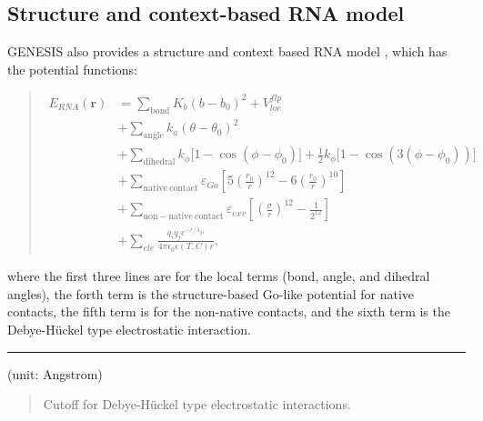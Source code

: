 \documentclass[a4paper,11pt,oneside,english]{sphinxmanual}
\begin{document}
\subsection{Structure and context-based RNA model}
\label{\detokenize{05_Energy:structure-and-context-based-rna-model}}
GENESIS also provides a structure and context based RNA model , which has the potential functions:
\begin{quote}

\vspace{-5mm}
\begin{equation*}
\begin{split}E_{RNA}(\mathbf{r}) & = \sum_{\mathrm{bond}} K_b\left(b - b_{0}\right)^2 + V_{loc}^{flp} \\
     & + \sum_{\mathrm{angle}} k_a \left(\theta - \theta_0\right)^2 \\
     & + \sum_{\mathrm{dihedral}} k_{\phi} \big[ 1-\cos(\phi - \phi_0) \big] + \frac{1}{2}k_{\phi} \big[ 1-\cos\left(3(\phi - \phi_0)\right) \big] \\
     & + \sum_{\mathrm{native\ contact}} \varepsilon_{Go} \left[ 5\left(\frac{r_0}{r}\right)^{12} - 6 \left(\frac{r_0}{r}\right)^{10} \right] \\
     & + \sum_{\mathrm{non-native\ contact}} \varepsilon_{exv} \left[ \left(\frac{\sigma}{r}\right)^{12} - \frac{1}{2^{12}} \right] \\
     & + \sum_{ele} \frac{q_i q_j e^{-r/\lambda_D}}{4\pi \epsilon_0 \epsilon(T, C) r}.\end{split}
\end{equation*}
\vspace{-3mm}
\end{quote}

where the first three lines are for the local terms (bond, angle, and dihedral
angles), the forth term is the structure-based Go-like potential for native
contacts, the fifth term is for the non-native contacts, and the sixth term is
the Debye-Hückel type electrostatic interaction.


\bigskip\hrule\bigskip


  (unit: Angstrom)
\begin{quote}


Cutoff for Debye-Hückel type electrostatic interactions.
\end{quote}
\end{document}
